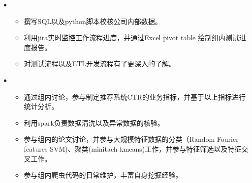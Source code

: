   \begin{itemize}[leftmargin=*]
     \item
        {\small
      \begin{itemize}
      \item 撰写SQL以及python脚本校核公司内部数据。
        \item 利用jira实时监控工作流程进度，并通过Excel pivot table 绘制组内测试进度报告。
         \item 对测试流程以及ETL开发流程有了更深入的了解。
         
       \end{itemize}
       }
        \item
           {\small
      \begin{itemize}
      \item 通过组内讨论，参与制定推荐系统CTR的业务指标，并基于以上指标进行统计分析。
         \item 利用spark负责数据清洗以及异常数据的核验。
          \item 参与组内的论文讨论，并参与大规模特征数据的分类（Random Fourier features SVM)、聚类(minitach kmeans)工作，并参与特征筛选以及特征交叉工作。
           \item 参与组内爬虫代码的日常维护，丰富自身挖掘经验。

            \end{itemize}

             }

  \end{itemize}

